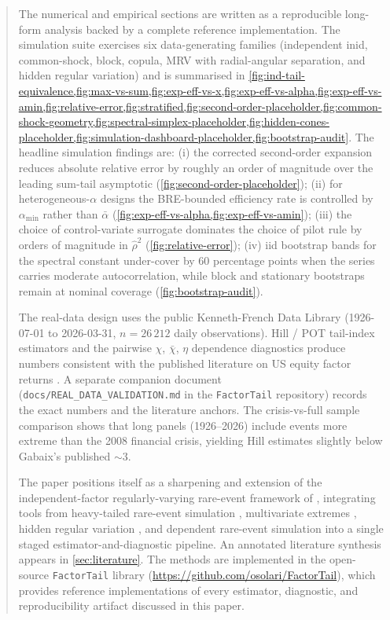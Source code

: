 \begin{abstract}
The numerical and empirical sections are written as a reproducible long-form
analysis backed by a complete reference implementation. The simulation suite
exercises six data-generating families (independent inid, common-shock,
block, copula, MRV with radial-angular separation, and hidden regular
variation) and is summarised in
\cref{fig:ind-tail-equivalence,fig:max-vs-sum,fig:exp-eff-vs-x,fig:exp-eff-vs-alpha,fig:exp-eff-vs-amin,fig:relative-error,fig:stratified,fig:second-order-placeholder,fig:common-shock-geometry,fig:spectral-simplex-placeholder,fig:hidden-cones-placeholder,fig:simulation-dashboard-placeholder,fig:bootstrap-audit}.
The headline simulation findings are: (i) the corrected second-order
expansion reduces absolute relative error by roughly an order of magnitude
over the leading sum-tail asymptotic (\cref{fig:second-order-placeholder});
(ii) for heterogeneous-$\alpha$ designs the BRE-bounded efficiency rate is
controlled by $\alpha_{\min}$ rather than $\bar\alpha$
(\cref{fig:exp-eff-vs-alpha,fig:exp-eff-vs-amin}); (iii) the choice of
control-variate surrogate dominates the choice of pilot rule by orders of
magnitude in $\widehat\rho^2$
(\cref{fig:relative-error}); (iv) iid bootstrap bands for the spectral
constant under-cover by 60 percentage points when the series carries
moderate autocorrelation, while block and stationary bootstraps remain at
nominal coverage (\cref{fig:bootstrap-audit}).

The real-data design uses the public Kenneth-French Data Library
(1926-07-01 to 2026-03-31, $n = 26\,212$ daily observations). Hill / POT
tail-index estimators and the pairwise $\chi$, $\bar\chi$, $\eta$
dependence diagnostics produce numbers consistent with the published
literature on US equity factor returns
\citep{Gabaix2009,Cont2001,EmbrechtsMcNeilFrey2005,ChristoffersenErrunzaJacobsLangloi2012}.
A separate companion document
(\texttt{docs/REAL\_DATA\_VALIDATION.md} in the
\texttt{FactorTail} repository) records the exact numbers and the
literature anchors. The crisis-vs-full sample comparison shows that long
panels (1926--2026) include events more extreme than the 2008 financial
crisis, yielding Hill estimates slightly below Gabaix's published $\sim 3$.

\medskip\noindent The paper positions itself as a sharpening and extension of
the independent-factor regularly-varying rare-event framework of
\citet{PourbabaeeSolari2019}, integrating tools from heavy-tailed rare-event
simulation \citep{AsmussenKroese2006,HartingerKortschak2009}, multivariate
extremes \citep{HultLindskogMikoschSamorodnitsky2005,Resnick2007}, hidden
regular variation \citep{LedfordTawn1996,MaulikResnick2005}, and dependent
rare-event simulation
\citep{BlanchetRojasNandayapa2011,ChengFuhPang2025} into a single staged
estimator-and-diagnostic pipeline. An annotated literature synthesis appears
in \cref{sec:literature}. The methods are implemented in the open-source
\texttt{FactorTail} library
(\url{https://github.com/osolari/FactorTail}), which provides reference
implementations of every estimator, diagnostic, and reproducibility artifact
discussed in this paper.
\end{abstract}
